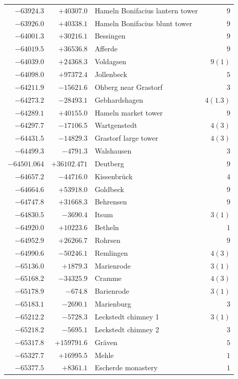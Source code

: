 \begin{center}
\begin{tabular}{r|r|p{170pt}|r}
\(-63924.3\)&\(+40307.0\)&Hameln Bonifacius lantern tower&\(9\)\\
\(-63926.0\)&\(+40338.1\)&Hameln Bonifacius blunt tower&\(9\)\\
\(-64001.3\)&\(+30216.1\)&Bessingen&\(9\)\\
\(-64019.5\)&\(+36536.8\)&Afferde&\(9\)\\
\(-64039.0\)&\(+24368.3\)&Voldagsen&\(9 (1)\)\\
\(-64098.0\)&\(+97372.4\)&Jollenbeck&\(5\)\\
\(-64211.9\)&\(-15621.6\)&Ohberg near Grastorf&\(3\)\\
\(-64273.2\)&\(-28493.1\)&Gebhardshagen&\(4(1.3)\)\\
\(-64289.1\)&\(+40155.0\)&Hameln market tower&\(9\)\\
\(-64297.7\)&\(-17106.5\)&Wartgenstedt&\(4 (3)\)\\
\(-64431.5\)&\(-14829.3\)&Grastorf large tower&\(4 (3)\)\\
\(-64499.3\)&\(-4791.3\)&Walshausen&\(3\)\\
\(-64501.064\)&\(+36102.471\)&Deutberg&\(9\)\\
\(-64657.2\)&\(-44716.0\)&Kissenbrück&\(4\)\\
\(-64664.6\)&\(+53918.0\)&Goldbeck&\(9\)\\
\(-64747.8\)&\(+31668.3\)&Behrensen&\(9\)\\
\(-64830.5\)&\(-3690.4\)&Itsum&\(3 (1)\)\\
\(-64920.0\)&\(+10223.6\)&Betheln&\(1\)\\
\(-64952.9\)&\(+26266.7\)&Rohrsen&\(9\)\\
\(-64990.6\)&\(-50246.1\)&Remlingen&\(4 (3)\)\\
\(-65136.0\)&\(+1879.3\)&Marienrode&\(3 (1)\)\\
\(-65168.2\)&\(-34325.9\)&Cramme&\(4 (3)\)\\
\(-65178.9\)&\(-674.8\)&Barienrode&\(3 (1)\)\\
\(-65183.1\)&\(-2690.1\)&Marienburg&\(3\)\\
\(-65212.2\)&\(-5728.3\)&Leckstedt chimney 1&\(3 (1)\)\\
\(-65218.2\)&\(-5695.1\)&Leckstedt chimney 2&\(3\)\\
\(-65317.8\)&\(+159791.6\)&Gräven&\(5\)\\
\(-65327.7\)&\(+16995.5\)&Mehle&\(1\)\\
\(-65377.5\)&\(+8361.1\)&Escherde monastery&\(1\)\\
\hline\end{tabular}\endgroup\end{center}
